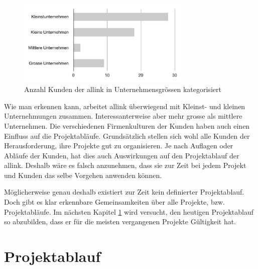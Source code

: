 \begin{figure}[htbp]
\begin{center}
\includegraphics[width=0.75\textwidth,angle=0]{./bilder/analyse/kundenkategorisierung.pdf}
\caption{Anzahl Kunden der allink in Unternehmensgrössen kategorisiert}
\label{pic:kundenkategorisierung}
\end{center}
\end{figure}

Wie man erkennen kann, arbeitet allink überwiegend mit Kleinst- und kleinen 
Unternehmungen zusammen. Interessanterweise aber mehr grosse als mittlere
Unternehmen. Die verschiedenen Firmenkulturen der Kunden haben auch einen 
Einfluss auf die Projektabläufe. Grundsätzlich stellen sich wohl alle Kunden
der Herausforderung, ihre Projekte gut zu organisieren. Je nach Auflagen oder
Abläufe der Kunden, hat dies auch Auswirkungen auf den Projektablauf der allink.
Deshalb wäre es falsch anzunehmen, dass sie zur Zeit bei jedem Projekt und 
Kunden das selbe Vorgehen anwenden können.

Möglicherweise genau deshalb existiert zur Zeit kein definierter Projektablauf. 
Doch gibt es klar erkennbare Gemeinsamkeiten über alle Projekte, bzw. Projektabläufe.
Im nächsten Kapitel \ref{chap:projektablauf} wird versucht, den heutigen Projektablauf so 
abzubilden, dass er für die meisten vergangenen Projekte Gültigkeit hat.

\section{Projektablauf}\label{chap:projektablauf}


% 

